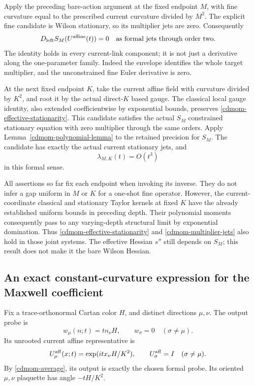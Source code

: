 Apply the preceding bare-action argument at the fixed
endpoint \(M\), with fine curvature equal to the prescribed
current curvature divided by \(M^2\). The explicit fine
candidate is Wilson stationary, so its multiplier jets
are zero. Consequently
\begin{equation}
          D_{\rm left}S_M(U^{\rm affine}(t))=0
                 \quad\hbox{as formal jets through order two}.
 \label{cdmom-effective-stationarity}
\end{equation}
The identity holds in every current-link component;
it is not just a derivative along the one-parameter family.
Indeed the envelope identifies the whole target multiplier,
and the unconstrained fine Euler derivative is zero.

At the next fixed endpoint \(K\), take the current affine
field with curvature divided by \(K^2\), and root it by
the actual direct-\(K\) based gauge. The classical local
gauge identity, also extended coefficientwise by exponential
bounds, preserves \eqref{cdmom-effective-stationarity}.
This candidate satisfies the actual \(S_M\) constrained
stationary equation with zero multiplier through the same
orders. Apply Lemma~\ref{cdmom-polynomial-lemma} to the
retained precision for \(S_M\). The candidate has exactly
the actual current stationary jets, and
\begin{equation}
             \lambda_{M,K}(t)=O(t^3)
 \label{cdmom-multiplier-jets}
\end{equation}
in this formal sense.

All assertions so far fix each endpoint when invoking
its inverse. They do not infer a gap uniform in \(M\)
or \(K\) for a one-shot fine operator. However, the
current-coordinate classical and stationary Taylor
kernels at fixed \(K\) have the already established
uniform bounds in preceding depth. Their polynomial
moments consequently pass to any varying-depth
structural limit by exponential domination.
Thus \eqref{cdmom-effective-stationarity} and
\eqref{cdmom-multiplier-jets} also hold in those joint
systems. The effective Hessian \(s''\) still depends
on \(S_M\); this result does not make it the bare
Wilson Hessian.

\subsection{An exact constant-curvature expression for the Maxwell coefficient}
\label{cdmom-determinant-section}

Fix a trace-orthonormal Cartan color \(H\), and distinct
directions \(\mu,\nu\). The output probe is
\[
 w_\mu(n;t)=t n_\nu H,\qquad w_\sigma=0\quad(\sigma\ne\mu).
\]
Its unrooted current affine representative is
\begin{equation}
 U_\mu^{\rm aff}(x;t)=\exp(i t x_\nu H/K^2),\qquad
 U_\sigma^{\rm aff}=I\quad(\sigma\ne\mu).
 \label{cdmom-probe}
\end{equation}
By \eqref{cdmom-average}, its output is exactly the
chosen formal probe. Its oriented \(\mu,\nu\) plaquette
has angle \(-tH/K^2\).


